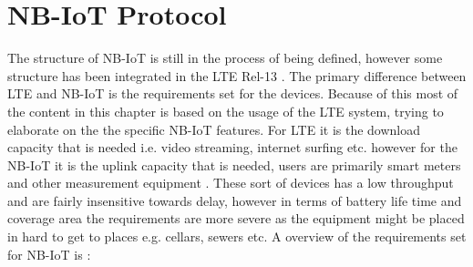 \chapter{NB-IoT Protocol}\label{ch:NB-IoT}

The structure of \gls{NB-IoT} is still in the process of being defined, however some structure has been integrated in the \gls{LTE} Rel-13 \citep{REL-13}. The primary difference between \gls{LTE} and \gls{NB-IoT} is the requirements set for the devices. Because of this most of the content in this chapter is based on the usage of the \gls{LTE} system, trying to elaborate on the the specific \gls{NB-IoT} features. For \gls{LTE} it is the download capacity that is needed i.e. video streaming, internet surfing etc. however for the \gls{NB-IoT} it is the uplink capacity that is needed, users are primarily smart meters and other measurement equipment \citep{primer}. These sort of devices has a low throughput and are fairly insensitive towards delay, however in terms of battery life time and coverage area the requirements are more severe as the equipment might be placed in hard to get to places e.g. cellars, sewers etc. A overview of the requirements set for \gls{NB-IoT} is \citep{NB-IoT_Book}:

